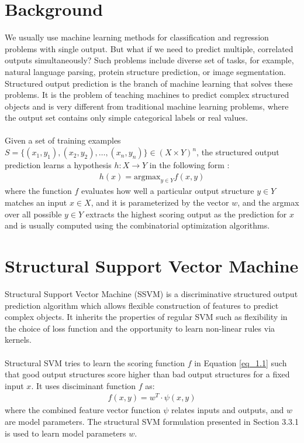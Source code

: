 \section{Background}
We usually use machine learning methods for classification and regression problems with single output.  But what if we need to predict multiple, correlated outputs simultaneously? Such problems include diverse set of tasks, for example, natural language parsing, protein structure prediction, or image segmentation. Structured output prediction is the branch of machine learning that solves these problems. It is the problem of teaching machines to predict complex structured objects and is very different from traditional machine learning problems, where the output set contains only simple categorical labels or real values.
\\\\
Given a set of training examples $S = {\{(x_1, y_1), (x_2, y_2),\ldots , (x_n, y_n )\} \in (X \times Y)^n}$, the structured output prediction learns a hypothesis $h : X \to Y$ in the following form \cite{Yu2011}:
\begin{align}
\label{eq_1.1}
h(x) = \text{argmax} _{y \in Y}f(x, y)
\end{align}
where the function $f$ evaluates how well a particular output structure $y \in Y$ matches an input $x \in X$, and it is parameterized by the vector $w$, and the argmax over all possible $y \in Y$ extracts the highest scoring output as the prediction for $x$ and is usually computed using the combinatorial optimization algorithms.

\section{Structural Support Vector Machine}
Structural Support Vector Machine (SSVM) is a discriminative structured output prediction algorithm which allows flexible construction of features to predict complex objects. It inherits the properties of regular SVM such as flexibility in the choice of loss function and the opportunity to learn non-linear rules via kernels. 
\\\\
Structural SVM tries to learn the scoring function $f$ in Equation \ref{eq_1.1} such that good output structures score higher than bad output structures for a fixed input $x$. It uses disciminant function $f$ as:
\begin{align}
\label{eq_1.2}
f(x, y) = w^T \cdot \psi(x, y)
\end{align}
where the combined feature vector function $\psi$ relates inputs and outputs, and $w$ are model parameters. The structural SVM formulation presented in Section 3.3.1 is used to learn model parameters $w$.

